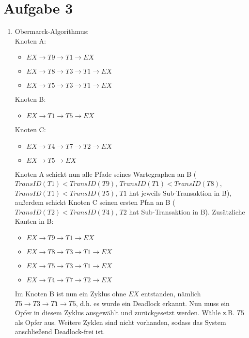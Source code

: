 \documentclass[a4paper]{article}
\begin{document}
\section*{Aufgabe 3}
\begin{enumerate}[label=\alph*)]
\item Obermarck-Algorithmus:\\
Knoten A: 
\begin{itemize}
\item $EX\rightarrow T9\rightarrow T1 \rightarrow EX$
\item $EX\rightarrow T8\rightarrow T3 \rightarrow T1 \rightarrow EX$
\item $EX\rightarrow T5\rightarrow T3 \rightarrow T1 \rightarrow EX$
\end{itemize}
Knoten B: 
\begin{itemize}
\item $EX\rightarrow T1\rightarrow T5 \rightarrow EX$
\end{itemize}
Knoten C: 
\begin{itemize}
\item $EX\rightarrow T4\rightarrow T7 \rightarrow T2 \rightarrow EX$
\item $EX\rightarrow  T5 \rightarrow EX$
\end{itemize}
Knoten A schickt nun alle Pfade seines Wartegraphen an B ($TransID(T1)<TransID(T9)$, $TransID(T1)<TransID(T8)$,  $TransID(T1)<TransID(T5)$, $T1$ hat jeweils Sub-Transaktion in B), außerdem schickt Knoten C seinen ersten Pfan an B ($TransID(T2)<TransID(T4)$, $T2$ hat Sub-Transaktion in B). Zusätzliche Kanten in B:
\begin{itemize}
\item $EX\rightarrow T9\rightarrow T1 \rightarrow EX$
\item $EX\rightarrow T8\rightarrow T3 \rightarrow T1 \rightarrow EX$
\item $EX\rightarrow T5\rightarrow T3 \rightarrow T1 \rightarrow EX$
\item $EX\rightarrow T4\rightarrow T7 \rightarrow T2 \rightarrow EX$
\end{itemize}
Im Knoten B ist nun ein Zyklus ohne $EX$ entstanden, nämlich $T5\rightarrow T3\rightarrow T1 \rightarrow T5$, d.h. es wurde ein Deadlock erkannt. Nun muss ein Opfer in diesem Zyklus ausgewählt und zurückgesetzt werden. Wähle z.B. $T5$ als Opfer aus. Weitere Zyklen sind nicht vorhanden, sodass das System anschließend Deadlock-frei ist.


\end{enumerate}
\end{document}
